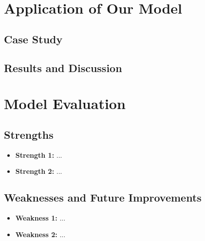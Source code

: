 \documentclass[demo]{mcmthesis}
\begin{document}
\section{Application of Our Model}

\subsection{Case Study}

\subsection{Results and Discussion}

\section{Model Evaluation}

\subsection{Strengths}
\begin{itemize}
    \item \textbf{Strength 1:} ...
    \item \textbf{Strength 2:} ...
\end{itemize}

\subsection{Weaknesses and Future Improvements}
\begin{itemize}
    \item \textbf{Weakness 1:} ...
    \item \textbf{Weakness 2:} ...
\end{itemize}
\end{document}
